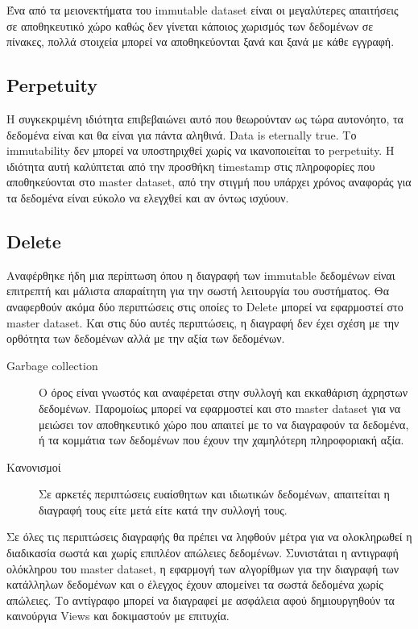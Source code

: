 Ένα από τα μειονεκτήματα του immutable dataset είναι οι μεγαλύτερες απαιτήσεις σε αποθηκευτικό χώρο καθώς δεν γίνεται κάποιος χωρισμός των δεδομένων σε πίνακες, πολλά στοιχεία μπορεί να αποθηκεύονται ξανά και ξανά με κάθε εγγραφή. 

\subsection{Perpetuity}
Η συγκεκριμένη ιδιότητα επιβεβαιώνει αυτό που θεωρούνταν ως τώρα αυτονόητο, τα δεδομένα είναι και θα είναι για πάντα αληθινά. Data is eternally true. Το immutability δεν μπορεί να υποστηριχθεί χωρίς να ικανοποιείται το perpetuity. Η ιδιότητα αυτή καλύπτεται από την προσθήκη timestamp στις πληροφορίες που αποθηκεύονται στο master dataset, από την στιγμή που υπάρχει χρόνος αναφοράς για τα δεδομένα είναι εύκολο να ελεγχθεί και αν όντως ισχύουν.

\subsection{Delete}
Αναφέρθηκε ήδη μια περίπτωση όπου η διαγραφή των immutable δεδομένων είναι επιτρεπτή και μάλιστα απαραίτητη για την σωστή λειτουργία του συστήματος. Θα αναφερθούν ακόμα δύο περιπτώσεις στις οποίες το Delete μπορεί να εφαρμοστεί στο master dataset. Και στις δύο αυτές περιπτώσεις, η διαγραφή δεν έχει σχέση με την ορθότητα των δεδομένων αλλά με την αξία των δεδομένων. 
\begin{description}
\item [Garbage collection] Ο όρος είναι γνωστός και αναφέρεται στην συλλογή και εκκαθάριση άχρηστων δεδομένων. Παρομοίως μπορεί να εφαρμοστεί και στο master dataset για να μειώσει τον αποθηκευτικό χώρο που απαιτεί με το να διαγραφούν τα δεδομένα, ή τα κομμάτια των δεδομένων που έχουν την χαμηλότερη πληροφοριακή αξία. 
\item [Κανονισμοί] Σε αρκετές περιπτώσεις ευαίσθητων και ιδιωτικών δεδομένων, απαιτείται η διαγραφή τους είτε μετά είτε κατά την συλλογή τους.
\end{description}

 Σε όλες τις περιπτώσεις διαγραφής θα πρέπει να ληφθούν μέτρα για να ολοκληρωθεί η διαδικασία σωστά και χωρίς επιπλέον απώλειες δεδομένων.
Συνιστάται η αντιγραφή ολόκληρου του master dataset, η εφαρμογή των αλγορίθμων για την διαγραφή των κατάλληλων δεδομένων και ο έλεγχος έχουν απομείνει τα σωστά δεδομένα χωρίς απώλειες. Το αντίγραφο μπορεί να διαγραφεί με ασφάλεια αφού δημιουργηθούν τα καινούργια Views και δοκιμαστούν με επιτυχία.

